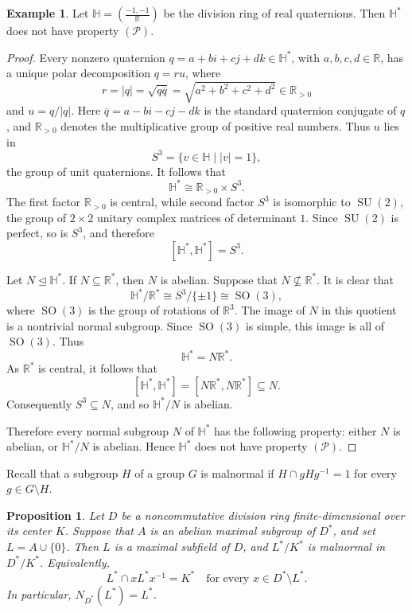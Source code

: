 \documentclass[11pt]{amsart}
\newtheorem{proposition}[theorem]{Proposition}
\theoremstyle{definition}
\newtheorem{example}[theorem]{Example}
\begin{document}
\begin{example}
\label{ex:Hamilton-no-P}
Let $\mathbb H=\left(\frac{-1,-1}{\mathbb R}\right)$ be the division ring of real quaternions. Then $\mathbb H^*$
does not have property $(\mathcal P)$.
\end{example}

\begin{proof}
Every nonzero quaternion $q=a+bi+cj+dk\in\mathbb H^*$, with
$a,b,c,d\in\mathbb R$, has a unique polar decomposition $q=ru$, where
$$
        r=|q|=\sqrt{q\overline q}
        =\sqrt{a^2+b^2+c^2+d^2}\in\mathbb R_{>0}
$$
and $u=q/|q|$. Here $\overline q=a-bi-cj-dk$ is the standard quaternion
conjugate of $q$, and $\mathbb R_{>0}$ denotes the multiplicative group of
positive real numbers. Thus $u$ lies in
$$
        S^3=\{v\in\mathbb H\mid |v|=1\},
$$
the group of unit quaternions. It follows that
$$
        \mathbb H^*\cong \mathbb R_{>0}\times S^3.
$$
The first factor $\mathbb R_{>0}$ is central, while second factor $S^3$ is isomorphic to $\operatorname{SU}(2)$, the group of
$2\times 2$ unitary complex matrices of determinant $1$. Since
$\operatorname{SU}(2)$ is perfect, so is $S^3$, and therefore
$$
        [\mathbb H^*,\mathbb H^*]=S^3.
$$

Let $N\trianglelefteq\mathbb H^*$. If $N\subseteq\mathbb R^*$, then $N$ is
abelian. Suppose that $N\not\subseteq\mathbb R^*$. It is clear that
$$
        \mathbb H^*/\mathbb R^*
        \cong S^3/\{\pm1\}
        \cong \operatorname{SO}(3),
$$
where $\operatorname{SO}(3)$ is the group of rotations of $\mathbb R^3$.
The image of $N$ in this quotient is a nontrivial normal subgroup. Since
$\operatorname{SO}(3)$ is simple, this image is all of $\operatorname{SO}(3)$.
Thus
$$
        \mathbb H^*=N\mathbb R^*.
$$
As $\mathbb R^*$ is central, it follows that
$$
        [\mathbb H^*,\mathbb H^*]
        =[N\mathbb R^*,N\mathbb R^*]\subseteq N.
$$
Consequently $S^3\subseteq N$, and so $\mathbb H^*/N$ is abelian.

Therefore every normal subgroup $N$ of $\mathbb H^*$ has the following
property: either $N$ is abelian, or $\mathbb H^*/N$ is abelian. Hence
$\mathbb H^*$ does not have property $(\mathcal P)$.
\end{proof}

Recall that a subgroup $H$ of a group $G$ is malnormal if
$H\cap gHg^{-1}=1$ for every $g\in G\setminus H$.

\begin{proposition}
\label{prop:malnormal-obstruction}
Let $D$ be a noncommutative division ring finite-dimensional over its center
$K$. Suppose that $A$ is an abelian maximal subgroup of $D^*$, and set
$L=A\cup\{0\}$. Then $L$ is a maximal subfield of $D$, and $L^*/K^*$ is
malnormal in $D^*/K^*$. Equivalently,
$$
L^*\cap xL^*x^{-1}=K^*\quad\text{for every }x\in D^*\setminus L^*.
$$
In particular, $N_{D^*}(L^*)=L^*$.
\end{proposition}
\end{document}
